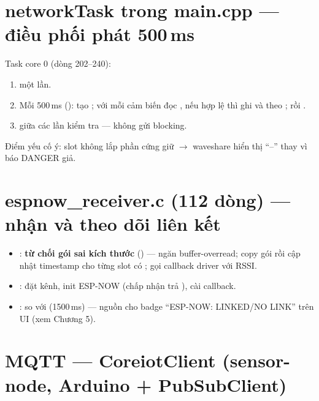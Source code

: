 \section{networkTask trong main.cpp — điều phối phát 500\,ms}

Task core 0 (dòng 202--240):
\begin{enumerate}
\item {} một lần.
\item Mỗi 500\,ms ():
tạo ; với mỗi cảm biến
 đọc , nếu hợp lệ thì ghi
 và  theo
; rồi .
\item {} giữa các lần kiểm tra — không gửi blocking.
\end{enumerate}

Điểm yếu cố ý: slot không lắp phần cứng giữ  $\rightarrow$
waveshare hiển thị ``--'' thay vì báo DANGER giả.

\section{espnow\_receiver.c (112 dòng) — nhận và theo dõi liên kết}

\begin{itemize}
\item {}: \textbf{từ chối gói sai kích thước}
() — ngăn buffer-overread; copy gói
rồi cập nhật timestamp  cho từng slot có
; gọi callback driver với RSSI.
\item {}: đặt kênh, init ESP-NOW (chấp nhận trả
), cài callback.
\item {}: so 
với  (1500\,ms) — nguồn cho badge
``ESP-NOW: LINKED/NO LINK'' trên UI (xem Chương 5).
\end{itemize}

\section{MQTT — CoreiotClient (sensor-node, Arduino + PubSubClient)}

